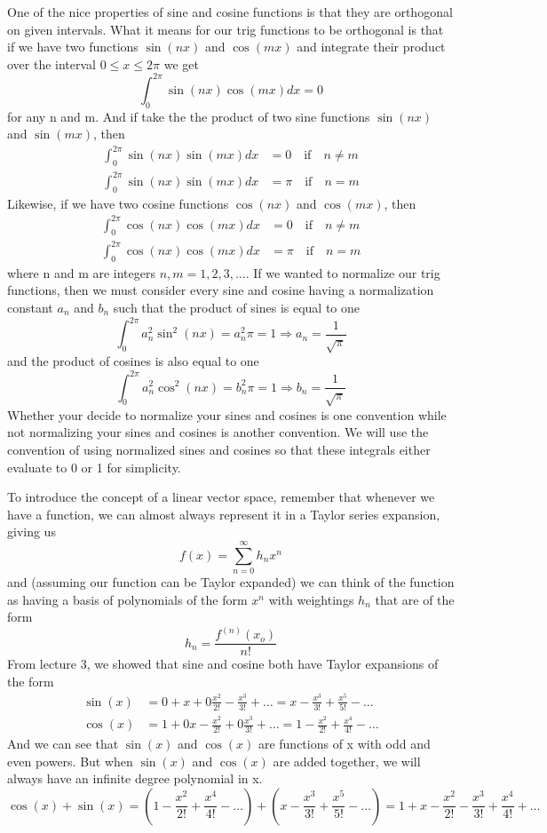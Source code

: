 \documentclass{article}
\newcommand{\be}{\begin{equation}}
\newcommand{\ee}{\end{equation}}
\begin{document}
One of the nice properties of sine and cosine functions is that they are orthogonal on given intervals.
What it means for our trig functions to be orthogonal is that if we have two functions $\sin(nx)$ and $\cos(mx)$ and integrate their product over the interval $0 \leq x \leq 2 \pi$ we get
\be \label{eq:sin_cos}
  \int_0^{2\pi} \sin(nx)\cos(mx) dx = 0
\ee
for any n and m.
And if take the the product of two sine functions $\sin(nx)$ and $\sin(mx)$, then
\be
  \begin{split}
    \int_0^{2\pi} \sin(nx)\sin(mx) dx &= 0 \quad \text{if} \quad n \neq m \\
    \int_0^{2\pi} \sin(nx)\sin(mx) dx &= \pi \quad \text{if} \quad n = m
  \end{split}
\ee
Likewise, if we have two cosine functions $\cos(nx)$ and $\cos(mx)$, then
\be
  \begin{split}
    \int_0^{2\pi} \cos(nx)\cos(mx) dx &= 0 \quad \text{if} \quad n \neq m \\
    \int_0^{2\pi} \cos(nx)\cos(mx) dx &= \pi \quad \text{if} \quad n = m
  \end{split}
\ee
where n and m are integers $n,m = 1, 2, 3, \hdots$.
If we wanted to normalize our trig functions, then we must consider every sine and cosine having a normalization constant $a_n$ and $b_n$ such that the product of sines is equal to one
\be \label{eq:sin_sin}
  \int_0^{2\pi} a_n^2 \sin^2(nx) = a_n^2\pi = 1 \Rightarrow a_n = \frac{1}{\sqrt{\pi}}
\ee
and the product of cosines is also equal to one
\be \label{eq:cos_cos}
  \int_0^{2\pi} a_n^2 \cos^2(nx) = b_n^2\pi = 1 \Rightarrow b_n = \frac{1}{\sqrt{\pi}}
\ee
Whether your decide to normalize your sines and cosines is one convention while not normalizing your sines and cosines is another convention.
We will use the convention of using normalized sines and cosines so that these integrals either evaluate to 0 or 1 for simplicity.

To introduce the concept of a linear vector space, remember that whenever we have a function, we can almost always represent it in a Taylor series expansion, giving us
\be
  f(x) = \sum_{n=0}^{\infty} h_n x^n
\ee
and (assuming our function can be Taylor expanded) we can think of the function as having a basis of polynomials of the form $x^n$ with weightings $h_n$ that are of the form
\be
  h_n = \frac{f^{(n)}(x_o)}{n!}
\ee
From lecture 3, we showed that sine and cosine both have Taylor expansions of the form
\be
  \begin{split}
    \sin(x) &= 0 + x + 0\frac{x^2}{2!} - \frac{x^3}{3!} + \hdots = x - \frac{x^3}{3!} + \frac{x^5}{5!} - \hdots \\
    \cos(x) &= 1 + 0x - \frac{x^2}{2!} + 0 \frac{x^3}{3!} + \hdots = 1 - \frac{x^2}{2!} + \frac{x^4}{4!} - \hdots
  \end{split}
\ee
And we can see that $\sin(x)$ and $\cos(x)$ are functions of x with odd and even powers.
But when $\sin(x)$ and $\cos(x)$ are added together, we will always have an infinite degree polynomial in x.
\be
  \cos(x) + \sin(x) = (1 - \frac{x^2}{2!} + \frac{x^4}{4!} - \hdots) + (x - \frac{x^3}{3!} + \frac{x^5}{5!} - \hdots) = 1 + x - \frac{x^2}{2!} - \frac{x^3}{3!} + \frac{x^4}{4!} + \hdots
\ee
\end{document}
